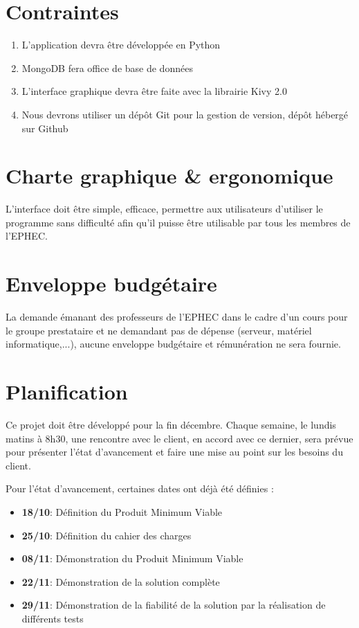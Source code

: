 \documentclass[12pt]{article}
\begin{document}
\section{Contraintes}

\begin{minipage}{\linewidth}
\begin{enumerate}
    \item L’application devra être développée en Python
    \item MongoDB fera office de base de données
    \item L’interface graphique devra être faite avec la librairie Kivy 2.0
    \item Nous devrons utiliser un dépôt Git pour la gestion de version, dépôt hébergé 
sur Github
\end{enumerate}
\end{minipage}

\section{Charte graphique \& ergonomique}

L’interface doit être simple, efficace,
permettre aux utilisateurs d’utiliser le programme sans difficulté
afin qu’il puisse être utilisable par tous les membres de l’EPHEC.

\section{Enveloppe budgétaire}

La demande émanant des professeurs de l’EPHEC
dans le cadre d’un cours pour le groupe prestataire
et ne demandant pas de dépense (serveur, matériel informatique,...),
aucune enveloppe budgétaire et rémunération ne sera fournie.

\section{Planification}

Ce projet doit être développé pour la fin décembre. Chaque semaine, le lundis 
matins à 8h30, une rencontre avec le client, en accord avec ce dernier, sera prévue 
pour présenter l’état d’avancement et faire une mise au point sur les besoins du 
client. 

\begin{minipage}{\linewidth}

Pour l’état d’avancement, certaines dates ont déjà été définies : 

\begin{itemize}
    \item \textbf{18/10}: Définition du Produit Minimum Viable
    \item \textbf{25/10}: Définition du cahier des charges
    \item \textbf{08/11}: Démonstration du Produit Minimum Viable  
    \item \textbf{22/11}: Démonstration de la solution complète 
    \item \textbf{29/11}: Démonstration de la fiabilité de la solution par la réalisation de différents tests
\end{itemize}
\end{minipage}
\end{document}
